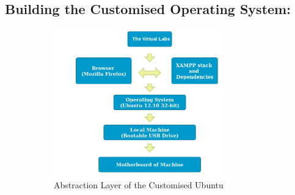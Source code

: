 \documentclass[conference]{IEEEtran}
\begin{document}
  \subsection{Building the Customised Operating System:}
  \begin{figure}
    \begin{subfigure}{\columnwidth}
      \includegraphics[width=0.8\textwidth,height=1.35\textwidth]{portable_usb}
      \caption{Abstraction Layer of the Customised Ubuntu}
    \end{subfigure} 
    ~
    \begin{subfigure}{\columnwidth}

\end{subfigure}
\end{figure}
\end{document}
